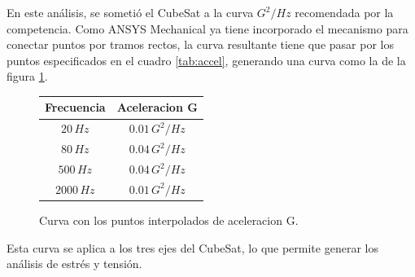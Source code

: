       En este análisis, se sometió el CubeSat a la curva $G^2/Hz$ recomendada por la competencia. Como ANSYS Mechanical
      ya tiene incorporado el mecanismo para conectar puntos por tramos rectos, la curva resultante tiene que pasar por
      los puntos especificados en el cuadro \ref{tab:accel}, generando una curva como la de la figura
      \ref{fig:graph_accel}.

      \begin{figure}[!ht]
        \centering
        \begin{minipage}{0.4\textwidth}
          \centering
          \begin{tabular}{|c|c|}
            \hline
            Frecuencia & Aceleracion G \\ \hline
            $20 \, Hz$ & $0.01 \, G^2/Hz$ \\ \hline
            $80 \, Hz$ & $0.04 \, G^2/Hz$ \\ \hline
            $500 \, Hz$ & $0.04 \, G^2/Hz$ \\ \hline
            $2000 \, Hz$ & $0.01 \, G^2/Hz$ \\ \hline
          \end{tabular}
          \label{tab:accel}
        \end{minipage}
        \hspace{0.05\textwidth}
        \begin{minipage}{0.4\textwidth}
          \caption{Curva con los puntos interpolados de aceleracion G.}
          \label{fig:graph_accel}
        \end{minipage}
      \end{figure}

      Esta curva se aplica a los tres ejes del CubeSat, lo que permite generar los análisis de estrés y tensión.

